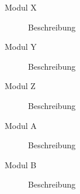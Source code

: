 
\begin{description}
\item[Modul X] Beschreibung
\item[Modul Y] Beschreibung
\item[Modul Z] Beschreibung
\item[Modul A] Beschreibung
\item[Modul B] Beschreibung
\end{description}